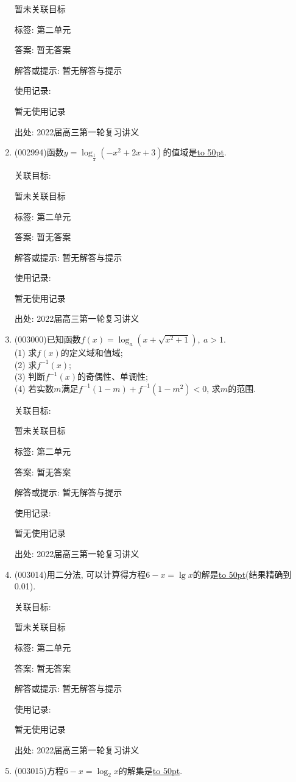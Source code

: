 \documentclass[10pt,a4paper]{article}
\newcommand{\blank}[1]{\underline{\hbox to #1pt{}}}
\begin{document}
\begin{enumerate}[1.]
暂未关联目标



标签: 第二单元

答案: 暂无答案

解答或提示: 暂无解答与提示

使用记录:

暂无使用记录


出处: 2022届高三第一轮复习讲义
\item { (002994)}函数$y=\log_{\frac 12}(-x^2+2x+3)$的值域是\blank{50}.


关联目标:

暂未关联目标



标签: 第二单元

答案: 暂无答案

解答或提示: 暂无解答与提示

使用记录:

暂无使用记录


出处: 2022届高三第一轮复习讲义
\item { (003000)}已知函数$f(x)=\log_a(x+\sqrt{x^2+1}), \ a>1$.\\
(1) 求$f(x)$的定义域和值域;\\
(2) 求$f^{-1}(x)$;\\
(3) 判断$f^{-1}(x)$的奇偶性、单调性;\\
(4) 若实数$m$满足$f^{-1}(1-m)+f^{-1}(1-m^2)<0$, 求$m$的范围.


关联目标:

暂未关联目标



标签: 第二单元

答案: 暂无答案

解答或提示: 暂无解答与提示

使用记录:

暂无使用记录


出处: 2022届高三第一轮复习讲义
\item { (003014)}用二分法, 可以计算得方程$6-x=\lg x$的解是\blank{50}(结果精确到0.01).


关联目标:

暂未关联目标



标签: 第二单元

答案: 暂无答案

解答或提示: 暂无解答与提示

使用记录:

暂无使用记录


出处: 2022届高三第一轮复习讲义
\item { (003015)}方程$6-x=\log_2 x$的解集是\blank{50}.



\end{enumerate}
\end{document}
